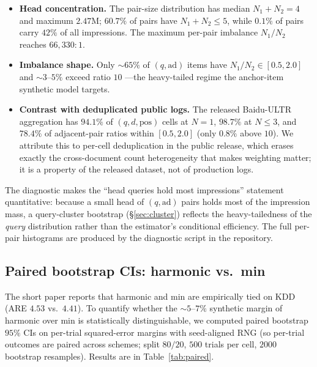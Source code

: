 \documentclass[11pt]{article}
\begin{document}
\begin{itemize}
\item \textbf{Head concentration.} The pair-size distribution has median
$N_1+N_2=4$ and maximum $2.47$M; $60.7\%$ of pairs have $N_1+N_2\le 5$,
while $0.1\%$ of pairs carry $42\%$ of all impressions. The maximum
per-pair imbalance $N_1/N_2$ reaches $66{,}330\!:\!1$.
\item \textbf{Imbalance shape.} Only $\sim\!65\%$ of $(q,\mathrm{ad})$
items have $N_1/N_2\in[0.5,2.0]$ and $\sim\!3$--$5\%$ exceed ratio $10$
---the heavy-tailed regime the anchor-item synthetic model targets.
\item \textbf{Contrast with deduplicated public logs.} The released
Baidu-ULTR aggregation has $94.1\%$ of $(q,d,\mathrm{pos})$ cells at
$N=1$, $98.7\%$ at $N\le3$, and $78.4\%$ of adjacent-pair ratios within
$[0.5,2.0]$ (only $0.8\%$ above $10$). We attribute this to per-cell
deduplication in the public release, which erases exactly the
cross-document count heterogeneity that makes weighting matter; it is a
property of the released dataset, not of production logs.
\end{itemize}

The diagnostic makes the ``head queries hold most impressions''
statement quantitative: because a small head of $(q,\mathrm{ad})$ pairs
holds most of the impression mass, a query-cluster bootstrap
(\S\ref{sec:cluster}) reflects the heavy-tailedness of the \emph{query}
distribution rather than the estimator's conditional efficiency. The
full per-pair histograms are produced by the diagnostic script in the
repository.

\subsection{Paired bootstrap CIs: harmonic vs.\ min}
\label{sec:paired}

The short paper reports that harmonic and min are empirically tied on
KDD (ARE $4.53$ vs.\ $4.41$). To quantify whether the $\sim\!5$--$7\%$
synthetic margin of harmonic over min is statistically distinguishable,
we computed paired bootstrap $95\%$ CIs on per-trial squared-error
margins with seed-aligned RNG (so per-trial outcomes are paired across
schemes; split $80/20$, $500$ trials per cell, $2000$ bootstrap
resamples). Results are in Table~\ref{tab:paired}.
\end{document}
